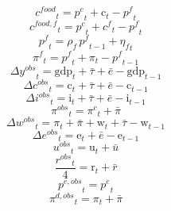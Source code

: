 \begin{dmath}
{{c^{food}}}_{t}={{p^{c}}}_{t}+{{\mathrm{c}}}_{t}-{{p^{f}}}_{t}
\end{dmath}
\begin{dmath}
{{c^{food,f}}}_{t}={{p^{c}}}_{t}+{{c^{f}}}_{t}-{{p^{f}}}_{t}
\end{dmath}
\begin{dmath}
{{p^{f}}}_{t}={{\rho_{f}}}\, {{p^{f}}}_{t-1}+{{\eta_{f}}}_{t}
\end{dmath}
\begin{dmath}
{{\pi^{f}}}_{t}={{p^{f}}}_{t}+{{\pi}}_{t}-{{p^{f}}}_{t-1}
\end{dmath}
\begin{dmath}
{{\Delta y^{obs}}}_{t}={{\mathrm{gdp}}}_{t}+{{\bar{\tau}}}+{{\bar{e}}}-{{\mathrm{gdp}}}_{t-1}
\end{dmath}
\begin{dmath}
{{\Delta c^{obs}}}_{t}={{\mathrm{c}}}_{t}+{{\bar{\tau}}}+{{\bar{e}}}-{{\mathrm{c}}}_{t-1}
\end{dmath}
\begin{dmath}
{{\Delta i^{obs}}}_{t}={{\mathrm{i}}}_{t}+{{\bar{\tau}}}+{{\bar{e}}}-{{\mathrm{i}}}_{t-1}
\end{dmath}
\begin{dmath}
{{\pi^{obs}}}_{t}={{\pi^{c}}}_{t}+{{\bar{\pi}}}
\end{dmath}
\begin{dmath}
{{\Delta w^{obs}}}_{t}={{\pi}}_{t}+{{\bar{\pi}}}+{{\mathrm{w}}}_{t}+{{\bar{\tau}}}-{{\mathrm{w}}}_{t-1}
\end{dmath}
\begin{dmath}
{{\Delta e^{obs}}}_{t}={{\mathrm{e}}}_{t}+{{\bar{e}}}-{{\mathrm{e}}}_{t-1}
\end{dmath}
\begin{dmath}
{{u^{obs}}}_{t}={{\mathrm{u}}}_{t}+{{\bar{u}}}
\end{dmath}
\begin{dmath}
\frac{{{r^{obs}}}_{t}}{4}={{\mathrm{r}}}_{t}+{{\bar{r}}}
\end{dmath}
\begin{dmath}
{{p^{e,obs}}}_{t}={{p^{e}}}_{t}
\end{dmath}
\begin{dmath}
{{\pi^{d,obs}}}_{t}={{\pi}}_{t}+{{\bar{\pi}}}
\end{dmath}
